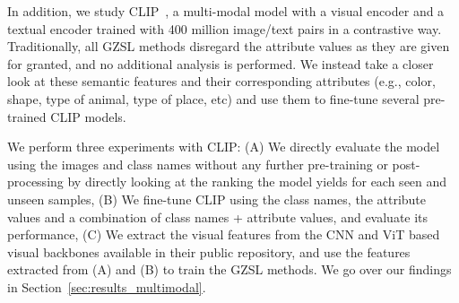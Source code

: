 In addition, we study CLIP~\cite{CLIP}, a multi-modal model with a visual encoder and a textual encoder trained with 400 million image/text pairs in a contrastive way. Traditionally, all GZSL methods disregard the attribute values as they are given for granted, and no additional analysis is performed. We instead take a closer look at these semantic features and their corresponding attributes (e.g., color, shape, type of animal, type of place, etc)  and use them to fine-tune several pre-trained CLIP models. 

We perform three experiments with CLIP: 
(A) We directly evaluate the model using the images and class names without any further pre-training or post-processing by directly looking at the ranking the model yields for each seen and unseen samples,
(B) We fine-tune CLIP using the class names, the attribute values and a combination of class names + attribute values, and evaluate its performance, 
(C) We extract the visual features from the CNN and ViT based visual backbones available in their public repository, and use the features extracted from (A) and (B) to train the GZSL methods.
We go over our findings in Section~\ref{sec:results_multimodal}.








